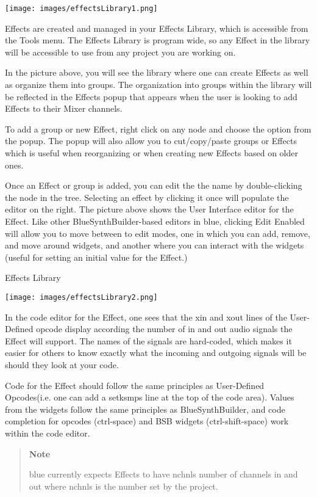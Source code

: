 \texttt{[image: images/effectsLibrary1.png]}

Effects are created and managed in your Effects Library, which is
accessible from the Tools menu. The Effects Library is program wide, so
any Effect in the library will be accessible to use from any project you
are working on.

In the picture above, you will see the library where one can create
Effects as well as organize them into groups. The organization into
groups within the library will be reflected in the Effects popup that
appears when the user is looking to add Effects to their Mixer channels.

To add a group or new Effect, right click on any node and choose the
option from the popup. The popup will also allow you to cut/copy/paste
groups or Effects which is useful when reorganizing or when creating new
Effects based on older ones.

Once an Effect or group is added, you can edit the the name by
double-clicking the node in the tree. Selecting an effect by clicking it
once will populate the editor on the right. The picture above shows the
User Interface editor for the Effect. Like other BlueSynthBuilder-based
editors in blue, clicking Edit Enabled will allow you to move between to
edit modes, one in which you can add, remove, and move around widgets,
and another where you can interact with the widgets (useful for setting
an initial value for the Effect.)

Effects Library

\texttt{[image: images/effectsLibrary2.png]}

In the code editor for the Effect, one sees that the xin and xout lines
of the User-Defined opcode display according the number of in and out
audio signals the Effect will support. The names of the signals are
hard-coded, which makes it easier for others to know exactly what the
incoming and outgoing signals will be should they look at your code.

Code for the Effect should follow the same principles as User-Defined
Opcodes(i.e. one can add a setksmps line at the top of the code area).
Values from the widgets follow the same principles as BlueSynthBuilder,
and code completion for opcodes (ctrl-space) and BSB widgets
(ctrl-shift-space) work within the code editor.

\begin{quote}
\textbf{Note}

blue currently expects Effects to have nchnls number of channels in and
out where nchnls is the number set by the project.
\end{quote}

